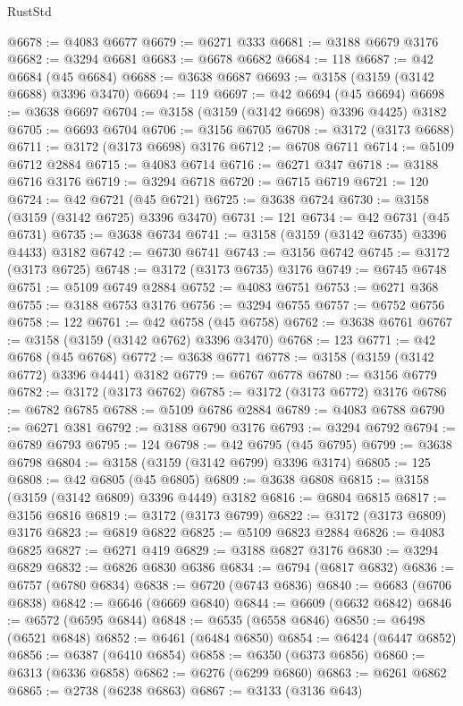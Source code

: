 \begin{lexlean}{RustStd}
\begin{coremodule}
@6678 := @4083 @6677
@6679 := @6271 @333
@6681 := @3188 @6679 @3176
@6682 := @3294 @6681
@6683 := @6678 @6682
@6684 := 118
@6687 := @42 @6684 (@45 @6684)
@6688 := @3638 @6687
@6693 := @3158 (@3159 (@3142 @6688) @3396 @3470)
@6694 := 119
@6697 := @42 @6694 (@45 @6694)
@6698 := @3638 @6697
@6704 := @3158 (@3159 (@3142 @6698) @3396 @4425) @3182
@6705 := @6693 @6704
@6706 := @3156 @6705
@6708 := @3172 (@3173 @6688)
@6711 := @3172 (@3173 @6698) @3176
@6712 := @6708 @6711
@6714 := @5109 @6712 @2884
@6715 := @4083 @6714
@6716 := @6271 @347
@6718 := @3188 @6716 @3176
@6719 := @3294 @6718
@6720 := @6715 @6719
@6721 := 120
@6724 := @42 @6721 (@45 @6721)
@6725 := @3638 @6724
@6730 := @3158 (@3159 (@3142 @6725) @3396 @3470)
@6731 := 121
@6734 := @42 @6731 (@45 @6731)
@6735 := @3638 @6734
@6741 := @3158 (@3159 (@3142 @6735) @3396 @4433) @3182
@6742 := @6730 @6741
@6743 := @3156 @6742
@6745 := @3172 (@3173 @6725)
@6748 := @3172 (@3173 @6735) @3176
@6749 := @6745 @6748
@6751 := @5109 @6749 @2884
@6752 := @4083 @6751
@6753 := @6271 @368
@6755 := @3188 @6753 @3176
@6756 := @3294 @6755
@6757 := @6752 @6756
@6758 := 122
@6761 := @42 @6758 (@45 @6758)
@6762 := @3638 @6761
@6767 := @3158 (@3159 (@3142 @6762) @3396 @3470)
@6768 := 123
@6771 := @42 @6768 (@45 @6768)
@6772 := @3638 @6771
@6778 := @3158 (@3159 (@3142 @6772) @3396 @4441) @3182
@6779 := @6767 @6778
@6780 := @3156 @6779
@6782 := @3172 (@3173 @6762)
@6785 := @3172 (@3173 @6772) @3176
@6786 := @6782 @6785
@6788 := @5109 @6786 @2884
@6789 := @4083 @6788
@6790 := @6271 @381
@6792 := @3188 @6790 @3176
@6793 := @3294 @6792
@6794 := @6789 @6793
@6795 := 124
@6798 := @42 @6795 (@45 @6795)
@6799 := @3638 @6798
@6804 := @3158 (@3159 (@3142 @6799) @3396 @3174)
@6805 := 125
@6808 := @42 @6805 (@45 @6805)
@6809 := @3638 @6808
@6815 := @3158 (@3159 (@3142 @6809) @3396 @4449) @3182
@6816 := @6804 @6815
@6817 := @3156 @6816
@6819 := @3172 (@3173 @6799)
@6822 := @3172 (@3173 @6809) @3176
@6823 := @6819 @6822
@6825 := @5109 @6823 @2884
@6826 := @4083 @6825
@6827 := @6271 @419
@6829 := @3188 @6827 @3176
@6830 := @3294 @6829
@6832 := @6826 @6830 @6386
@6834 := @6794 (@6817 @6832)
@6836 := @6757 (@6780 @6834)
@6838 := @6720 (@6743 @6836)
@6840 := @6683 (@6706 @6838)
@6842 := @6646 (@6669 @6840)
@6844 := @6609 (@6632 @6842)
@6846 := @6572 (@6595 @6844)
@6848 := @6535 (@6558 @6846)
@6850 := @6498 (@6521 @6848)
@6852 := @6461 (@6484 @6850)
@6854 := @6424 (@6447 @6852)
@6856 := @6387 (@6410 @6854)
@6858 := @6350 (@6373 @6856)
@6860 := @6313 (@6336 @6858)
@6862 := @6276 (@6299 @6860)
@6863 := @6261 @6862
@6865 := @2738 (@6238 @6863)
@6867 := @3133 (@3136 @643)

\end{coremodule}
\end{lexlean}
